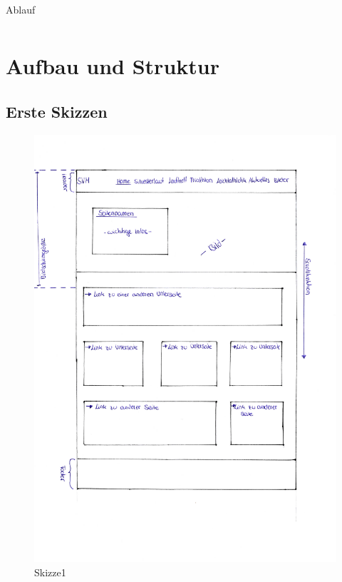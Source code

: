 \documentclass[12pt,a4paper]{article}
\begin{document}
\begin{table}
\begin{tabular}[h]{c|c|p{9cm}}
\end{tabular}
\caption{Ablauf}
\label{table:Ablauf}
\end{table}

\newpage
\section{Aufbau und Struktur}
\subsection{Erste Skizzen}
\begin{figure}[!htbp]
	\includegraphics[scale=0.75]{Skizze01.pdf}
	\caption{Skizze1}
	\label{img:Skizze1}
\end{figure}
\newpage
\end{document}
